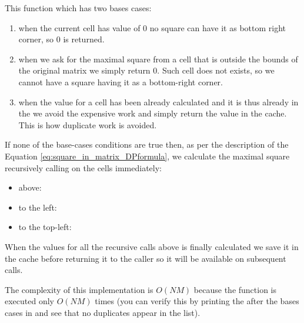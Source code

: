 This function which has two bases cases:
\begin{enumerate}
	\item when the current cell has value of $0$ no square can have it as bottom
	right corner, so $0$ is returned.
	\item when we ask for the maximal square from a cell that is outside the
	bounds of the original matrix we simply return $0$. Such cell does not
	exists, so we cannot have a square having it as a bottom-right corner. 
	\item when the value for a cell has been already calculated and it is thus
	already in the  we avoid the expensive work and simply return
	the value in the cache. This is how duplicate work is avoided.
\end{enumerate}
If none of the base-cases conditions are true then, as per the description of
the Equation \ref{eq:square_in_matrix_DPformula}, we calculate the maximal square recursively calling
 on the cells immediately:
\begin{itemize}
	\item above:
	\item to the left: 
	\item to the top-left: 
\end{itemize}

When the values for all the recursive calls above is finally calculated we save it in the cache before returning it
to the caller so it will be available on subsequent calls.

The complexity of this implementation is $O(NM)$ because the function
 is executed only $O(NM)$
times (you can verify this by printing the  after the bases cases
in  and see that no duplicates
appear in the list).







